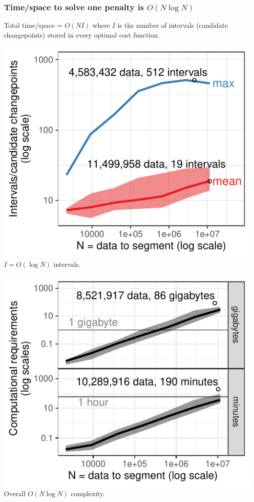 \documentclass[t]{beamer}
\begin{document}
\begin{frame}[fragile]
  \frametitle{Time/space to solve one penalty is $O(N \log N)$}

  Total time/space = $O(NI)$ where $I$ is the number of intervals
  (candidate changepoints) stored in every optimal cost function.

  \begin{minipage}{0.48\textwidth}
\centering
    \includegraphics[width=\textwidth]{jss-figure-target-intervals-models}
    $I=O(\log N)$ intervals.
  \end{minipage}
  \begin{minipage}{0.48\textwidth}
\centering
    \includegraphics[width=\textwidth]{jss-figure-target-intervals-models-computation}
    Overall  $O(N \log N)$ complexity.
  \end{minipage}
  

\end{frame}
\end{document}
